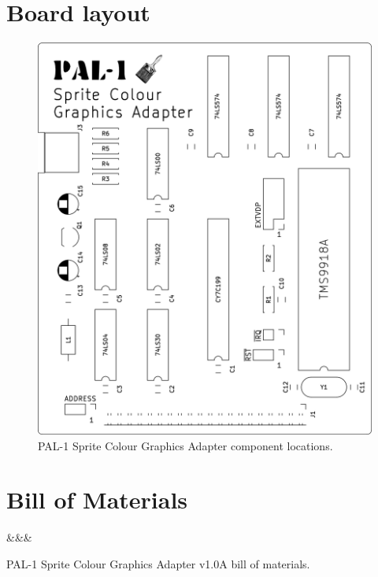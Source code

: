\documentclass[a4paper,11pt,twoside,openright]{report}
\begin{document}
\chapter{Board layout}
\begin{figure}[h!]
\centering
\includegraphics[scale=.25]{images/scga-brd-1.0a.png}
\caption[Sprite Colour Graphics Adapter component locations]{PAL-1 Sprite Colour Graphics Adapter component locations.}
\label{fig:layout}
\end{figure}

\chapter{Bill of Materials}
\label{sec:bom}

\begin{table}[htb]
	{\Ref&\Qnty&\Value&\Description}
	\caption[Sprite Colour Graphics Adapter bill of materials]{PAL-1 Sprite Colour Graphics Adapter v1.0A bill of materials.}
	\label{tab:bom}
\end{table}



\end{document}
